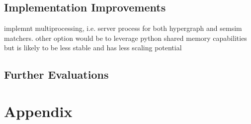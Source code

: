 \documentclass[11pt]{scrreprt}
\begin{document}
\section{Implementation Improvements}
implemnt multiprocessing, i.e. server process for both hypergraph and semsim matchers. other option would be to leverage python shared memory capabilities but is likely to be less stable and has less scaling potential

\section{Further Evaluations}


\printbibliography
\appendix
\chapter{Appendix}

\end{document}

